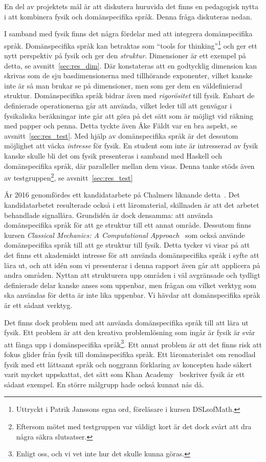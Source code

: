 En del av projektets mål är att diskutera huruvida det finns en pedagogisk nytta i att kombinera fysik och domänspecifika språk. Denna fråga diskuteras nedan.

I samband med fysik finns det några fördelar med att integrera domänspecifika språk. Domänspecifika språk kan betraktas som ``tools for thinking''\footnote{Uttryckt i Patrik Janssons egna ord, föreläsare i kursen DSLsofMath.} och ger ett nytt perspektiv på fysik och ger den \textit{struktur}. Dimensioner är ett exempel på detta, se avsnitt~\ref{sec:res_dim}. Där konstateras att en godtycklig dimension kan skrivas som de sju basdimensionerna med tillhörande exponenter, vilket kanske inte är så man brukar se på dimensioner, men som ger dem en väldefinierad struktur. Domänspecifika språk bidrar även med \textit{rigorösitet} till fysik. Enbart de definierade operationerna går att använda, vilket leder till att genvägar i fysikaliska beräkningar inte går att göra på det sätt som är möjligt vid räkning med papper och penna. Detta tyckte även Åke Fäldt var en bra aspekt, se avsnitt~\ref{sec:res_test}. Med hjälp av domänspecifika språk är det dessutom möjlighet att väcka \textit{intresse} för fysik. En student som inte är intresserad av fysik kanske skulle bli det om fysik presenteras i samband med Haskell och domänspecifika språk, där paralleller mellan dem visas. Denna tanke stöds även av testgruppen\footnote{Eftersom mötet med testgruppen var väldigt kort är det dock svårt att dra några säkra slutsatser.}, se avsnitt~\ref{sec:res_test}

År 2016 genomfördes ett kandidatarbete på Chalmers liknande
detta~\cite{kandidat2016}. Det kandidatarbetet resulterade också i ett
läromaterial, skillnaden är att det arbetet behandlade signallära. Grundidén är
dock densamma: att använda domänspecifika språk för att ge struktur till ett
annat område. Dessutom finns kursen \textit{Classical Mechanics: A Computational Approach}~\cite{classical-mechanics-course-mit-2008} som också använde domänspecifika språk till att ge struktur till fysik. Detta tycker vi visar på att det finns ett
akademiskt intresse för att använda domänspecifika språk i syfte att lära ut,
och att idén som vi presenterar i denna rapport även går att applicera på
andra områden. Nyttan att strukturera upp områden i väl avgränsade och
tydligt definierade delar kanske anses som uppenbar, men frågan om vilket
verktyg som ska användas för detta är inte lika uppenbar. Vi hävdar att
domänspecifika språk är ett sådant verktyg.

Det finns dock problem med att använda domänspecifika språk till att lära ut fysik. Ett problem är att den kreativa problemlösning som ingår är fysik är svår att fånga upp i domänspecifika språk\footnote{Enligt oss, och vi vet inte hur det skulle kunna göras.}. Ett annat problem är att det finns risk att fokus glider från fysik till domänspecifika språk. Ett läromaterialet om renodlad fysik med ett lättsamt språk och noggrann förklaring av koncepten hade säkert varit mycket uppskattat, det sätt som Khan Academy~\cite{khan} beskriver fysik är ett sådant exempel. En större målgrupp hade också kunnat nås då.

